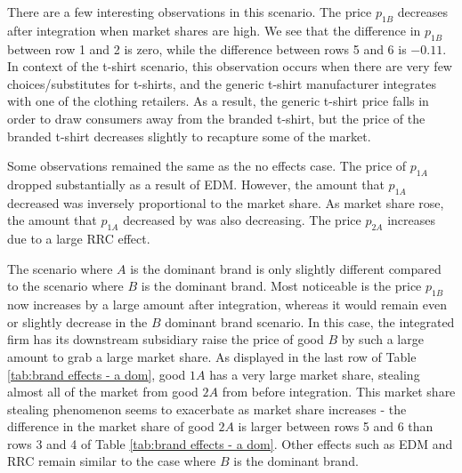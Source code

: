 \documentclass[12pt]{article}%
\begin{document}
There are a few interesting observations in this scenario. The price $p_{1B}$ decreases after integration when market shares are high. We see that the difference in $p_{1B}$ between row 1 and 2 is zero, while the difference between rows 5 and 6 is $-0.11$. In context of the t-shirt scenario, this observation occurs when there are very few choices/substitutes for t-shirts, and the generic t-shirt manufacturer integrates with one of the clothing retailers. As a result, the generic t-shirt price falls in order to draw consumers away from the branded t-shirt, but the price of the branded t-shirt decreases slightly to recapture some of the market.

Some observations remained the same as the no effects case. The price of $p_{1A}$ dropped substantially as a result of EDM. However, the amount that $p_{1A}$ decreased was inversely proportional to the market share. As market share rose, the amount that $p_{1A}$ decreased by was also decreasing. The price $p_{2A}$ increases due to a large RRC effect. 

The scenario where $A$ is the dominant brand is only slightly different compared to the scenario where $B$ is the dominant brand. Most noticeable is the price $p_{1B}$ now increases by a large amount after integration, whereas it would remain even or slightly decrease in the $B$ dominant brand scenario. In this case, the integrated firm has its downstream subsidiary raise the price of good $B$ by such a large amount to grab a large market share. As displayed in the last row of Table \ref{tab:brand effects - a dom}, good $1A$ has a very large market share, stealing almost all of the market from good $2A$ from before integration. This market share stealing phenomenon seems to exacerbate as market share increases - the difference in the market share of good $2A$ is larger between rows 5 and 6 than rows 3 and 4 of Table \ref{tab:brand effects - a dom}. Other effects such as EDM and RRC remain similar to the case where $B$ is the dominant brand.
\end{document}
